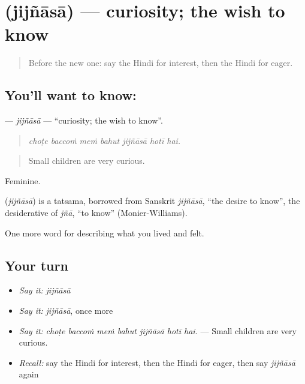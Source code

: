 \section[\texorpdfstring{\hi{जिज्ञासा} (jijñāsā)}{जिज्ञासा (jijñāsā)}]{ (jijñāsā) — curiosity; the wish to know}

\label{lesson:HI-C464-jijnasa}



\begin{quote}
Before the new one: say the Hindi for interest, then the Hindi for eager.
\end{quote}

\subsection*{You'll want to know: }
\textbf{} — \emph{jijñāsā} — \textquotedblleft{}curiosity; the wish to know\textquotedblright{}.

\begin{quote}
      
\end{quote}

\begin{quote}
\emph{choṭe baccoṁ meṁ bahut jijñāsā hotī hai.}
\end{quote}

\begin{quote}
Small children are very curious.
\end{quote}

Feminine.

\begin{cousinweb}
\textbf{} (\emph{jijñāsā}) is a tatsama, borrowed from Sanskrit \emph{jijñāsā}, \textquotedblleft{}the desire to know\textquotedblright{}, the desiderative of \emph{jñā}, \textquotedblleft{}to know\textquotedblright{} (Monier-Williams).
\end{cousinweb}

\begin{grammarlens}[title={What you've built}]
One more word for describing what you lived and felt.
\end{grammarlens}

\subsection*{Your turn}
\begin{itemize}
\raggedright
  \item \emph{Say it:} \emph{jijñāsā}
  \item \emph{Say it:} \emph{jijñāsā}, once more
  \item \emph{Say it:} \emph{choṭe baccoṁ meṁ bahut jijñāsā hotī hai.} — Small children are very curious.
  \item \emph{Recall:} say the Hindi for interest, then the Hindi for eager, then say \emph{jijñāsā} again
\end{itemize}

